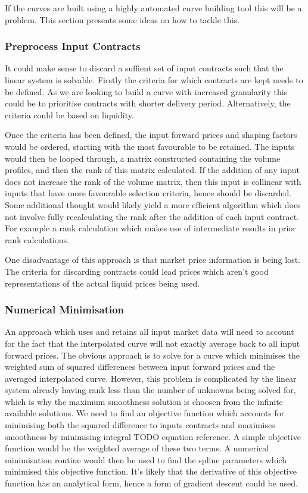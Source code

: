 \documentclass{article}
\begin{document}
If the curves are built using a highly automated curve building tool this will be a problem.
This section presents some ideas on how to tackle this.

\subsubsection{Preprocess Input Contracts}
It could make sense to discard a suffient set of input contracts 
such that the linear system is solvable. Firstly the criteria for which contracts
are kept needs to be defined. As we are looking to build a curve with increased granularity
this could be to prioritise contracts with shorter delivery period. Alternatively, the
criteria could be based on liquidity.

Once the criteria has been defined, the input forward prices and shaping factors would
be ordered, starting with the most favourable to be retained. The inputs would then
be looped through, a matrix constructed containing the volume profiles, and then the rank
of this matrix calculated. If the addition of any input does not increase the rank of
the volume matrix, then this input is collinear with inputs that have more favourable 
selection criteria, hence should be discarded. Some additional thought would likely
yield a more efficient algorithm which does not involve fully recalculating the rank 
after the addition of each input contract. For example a rank calculation which makes
use of intermediate results in prior rank calculations.

\bigskip

One disadvantage of this approach is that market price information is being lost. The
criteria for discarding contracts could lead prices which aren't good
representations of the actual liquid prices being used.

\subsubsection{Numerical Minimisation}
An approach which uses and retains all input market data will need to account
for the fact that the interpolated curve will not exactly average back to all input
forward prices. The obvious approach is to solve for a curve which minimises the
weighted sum of squared differences between input forward prices and the averaged 
interpolated curve. However, this problem is complicated by the linear system
already having rank less than the number of unknowns being solved for, which is why
the maximum smoothness solution is choosen from the infinite available solutions.
We need to find an objective function which accounts for minimising both the squared
difference to inputs contracts and maximises smoothness by minimising integral 
TODO equation reference. A simple objective function would be the weighted average
of these two terms. A numerical minimisation routine would then be used to find the
spline parameters which minimised this objective function. It's likely that the
derivative of this objective function has an analytical form, hence a form of
gradient descent could be used.
\end{document}
